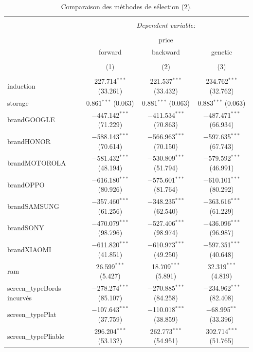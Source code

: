 \documentclass[
  12pt,
]{report}
\begin{document}
\begin{table}[!htbp] \centering 
  \caption{Comparaison des méthodes de sélection (2).} 
  \label{} 
\footnotesize 
\begin{tabular}{@{\extracolsep{5pt}}lccc} 
\\[-1.8ex]\hline 
\hline \\[-1.8ex] 
 & \multicolumn{3}{c}{\textit{Dependent variable:}} \\ 
\cline{2-4} 
\\[-1.8ex] & \multicolumn{3}{c}{price} \\ 
 & forward & backward & genetic \\ 
\\[-1.8ex] & (1) & (2) & (3)\\ 
\hline \\[-1.8ex] 
 induction & 227.714$^{***}$ (33.261) & 221.537$^{***}$ (33.432) & 234.762$^{***}$ (32.762) \\ 
  storage & 0.861$^{***}$ (0.063) & 0.881$^{***}$ (0.063) & 0.883$^{***}$ (0.063) \\ 
  brandGOOGLE & $-$447.142$^{***}$ (71.229) & $-$411.534$^{***}$ (70.863) & $-$487.471$^{***}$ (66.934) \\ 
  brandHONOR & $-$588.143$^{***}$ (70.614) & $-$566.963$^{***}$ (70.150) & $-$597.635$^{***}$ (67.743) \\ 
  brandMOTOROLA & $-$581.432$^{***}$ (48.194) & $-$530.809$^{***}$ (51.794) & $-$579.592$^{***}$ (46.991) \\ 
  brandOPPO & $-$616.180$^{***}$ (80.926) & $-$575.601$^{***}$ (81.764) & $-$610.101$^{***}$ (80.292) \\ 
  brandSAMSUNG & $-$357.460$^{***}$ (61.256) & $-$348.235$^{***}$ (62.540) & $-$363.616$^{***}$ (61.229) \\ 
  brandSONY & $-$470.079$^{***}$ (98.796) & $-$527.406$^{***}$ (98.974) & $-$436.096$^{***}$ (96.987) \\ 
  brandXIAOMI & $-$611.820$^{***}$ (41.851) & $-$610.973$^{***}$ (49.250) & $-$597.351$^{***}$ (40.648) \\ 
  ram & 26.599$^{***}$ (5.427) & 18.709$^{***}$ (5.891) & 32.319$^{***}$ (4.819) \\ 
  screen\_typeBords incurvés & $-$278.274$^{***}$ (85.107) & $-$270.885$^{***}$ (84.258) & $-$234.962$^{***}$ (82.408) \\ 
  screen\_typePlat & $-$107.643$^{***}$ (37.759) & $-$110.018$^{***}$ (38.859) & $-$68.995$^{**}$ (33.396) \\ 
  screen\_typePliable & 296.204$^{***}$ (53.132) & 262.773$^{***}$ (54.951) & 302.714$^{***}$ (51.765) \\ 

\end{tabular}
\end{table}
\end{document}
